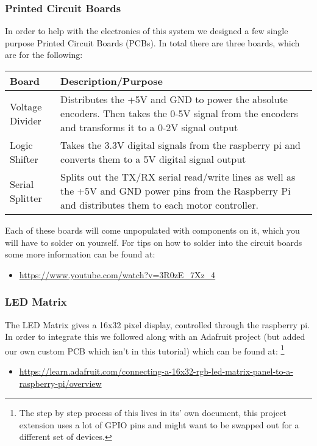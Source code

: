 \documentclass[12pt]{article}
\begin{document}
\subsubsection{Printed Circuit Boards}
In order to help with the electronics of this system we designed a few single purpose Printed Circuit Boards (PCBs). In total there are three boards, which are for the following:
\bigskip

\begin{tabular}[2]{| p{5cm} | p{10cm} | }
	\hline
	\textbf{Board} & \textbf{Description/Purpose} \\ \hline
	Voltage Divider & Distributes the +5V and GND to power the absolute encoders. Then takes the 0-5V signal from the encoders and transforms it to a 0-2V signal output \\ \hline
	Logic Shifter & Takes the 3.3V digital signals from the raspberry pi and converts them to a 5V digital signal output \\ \hline
	Serial Splitter & Splits out the TX/RX serial read/write lines as well as the +5V and GND power pins from the Raspberry Pi and distributes them to each motor controller. \\ \hline
\end{tabular}
\bigskip

Each of these boards will come unpopulated with components on it, which you will have to solder on yourself.  For tips on how to solder into the circuit boards some more information can be found at:
\begin{itemize}
	\item \href{https://www.youtube.com/watch?v=3R0zE_7Xz_4}{https://www.youtube.com/watch?v=3R0zE\_7Xz\_4}
\end{itemize}


\subsubsection{LED Matrix}
The LED Matrix gives a 16x32 pixel display, controlled through the raspberry pi. In order to integrate this we followed along with an Adafruit project (but added our own custom PCB which isn't in this tutorial) which can be found at: \footnote{The step by step process of this lives in its' own document, this project extension uses a lot of GPIO pins and might want to be swapped out for a different set of devices.} 
\begin{itemize}
  \item \href{https://learn.adafruit.com/connecting-a-16x32-rgb-led-matrix-panel-to-a-raspberry-pi/overview}{https://learn.adafruit.com/connecting-a-16x32-rgb-led-matrix-panel-to-a-raspberry-pi/overview}
\end{itemize}
\end{document}
